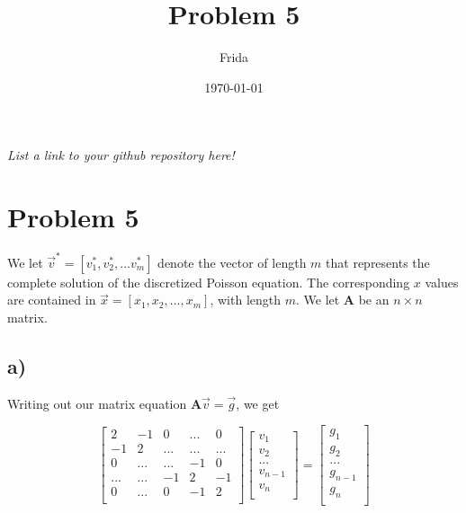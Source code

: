 \documentclass[english,notitlepage]{revtex4-1}  %
\begin{document}
\title{Problem 5}      %
\author{Frida}          %
\date{\today}                             %
\noaffiliation                            %


\maketitle

\textit{List a link to your github repository here!}

\section*{Problem 5}

  We let $\vec{v}^* = [v^*_1, v^*_2, ... v^*_m]$ denote the vector of length $m$ that represents the complete solution of the discretized Poisson equation. The corresponding $x$ values are contained in $\vec{x} = [x_1, x_2, ..., x_m]$, with length $m$. We let \textbf{A} be an $n \times n$ matrix.

  \subsection*{a)}

    Writing out our matrix equation $\boldsymbol{A} \vec{v} = \vec{g}$, we get

    \begin{equation}
      \begin{bmatrix}
          2 & -1 & 0 & ... & 0 \\
          -1 & 2 & ... & ... & ... \\
          0 & ... & ... & -1 & 0 \\
          ... & ... & -1 & 2 & -1 \\
          0 & ... & 0 & -1 & 2 \\
      \end{bmatrix} \begin{bmatrix}
          v_1 \\
          v_2 \\
          ... \\
          v_{n-1} \\
          v_n \\
      \end{bmatrix} =
      \begin{bmatrix}
          g_1 \\
          g_2 \\
          ... \\
          g_{n-1} \\
          g_n \\
      \end{bmatrix}
    \end{equation}
\end{document}
